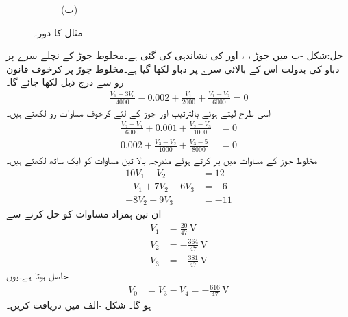 \begin{figure}
\begin{subfigure}{1\textwidth}
%
\caption*{(ب)}
\end{subfigure}
\caption{مثال  کا دور۔}
\label{شکل_جوڑ_تابع_منبع_مخلوط_جوڑ_الف}
\end{figure}%

حل:شکل -ب میں جوڑ ، ،   اور  کی نشاندہی کی گئی ہے۔مخلوط جوڑ کے نچلے سرے پر  دباو کی بدولت اس کے بالائی سرے پر  دباو لکھا گیا ہے۔مخلوط جوڑ پر کرخوف قانون رو سے درج ذیل لکھا جائے گا۔
\begin{align*}
\frac{V_1+3V_a}{4000}-0.002+\frac{V_1}{2000}+\frac{V_1-V_2}{6000}=0
\end{align*}
اسی طرح  لیتے ہوئے  بالترتیب  اور   جوڑ کے لئے کرخوف مساوات رو لکھتے ہیں۔
\begin{align*}
\frac{V_2-V_1}{6000}+0.001+\frac{V_2-V_3}{1000}&=0\\
0.002+\frac{V_3-V_2}{1000}+\frac{V_3-5}{8000}&=0
\end{align*}
مخلوط جوڑ کے مساوات میں  پر کرتے ہوئے مندرجہ بالا تین مساوات کو ایک ساتھ لکھتے ہیں۔
\begin{align*}
10 V_1-V_2&=12\\
-V_1+7V_2-6V_3&=-6\\
-8V_2+9V_3&=-11
\end{align*}
ان تین ہمزاد مساوات کو حل کرنے سے
\begin{align*}
V_1&=\frac{20}{47} \, \si{\volt}\\
V_2&=-\frac{364}{47} \, \si{\volt}\\
V_3&=-\frac{381}{47} \, \si{\volt}
\end{align*}
حاصل ہوتا ہے۔یوں
\begin{align*}
V_0&=V_3-V_4=-\frac{616}{47} \, \si{\volt}
\end{align*}
ہو گا۔
شکل -الف میں  دریافت کریں۔

